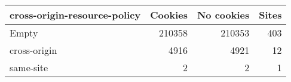 \begin{tabular}{lrrr}
\toprule
cross-origin-resource-policy &  Cookies &  No cookies &  Sites \\
\midrule
                       Empty &   210358 &      210353 &    403 \\
                cross-origin &     4916 &        4921 &     12 \\
                   same-site &        2 &           2 &      1 \\
\bottomrule
\end{tabular}
